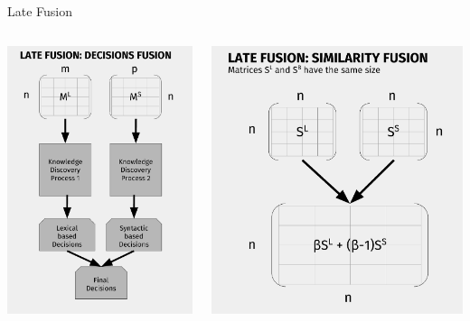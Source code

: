 \documentclass[10pt,xcolor=table]{beamer}
\begin{document}
\begin{frame}{Late Fusion}
\begin{columns}
	\center
	\begin{minipage}[c][0.5\textheight][c]{\linewidth}
	\centering
	\includegraphics[width=.9\linewidth]{image2/Chapitre3/lf1_diag.pdf}
	\end{minipage}
	\center
	\begin{minipage}[c][0.5\textheight][c]{\linewidth}
		\centering
	  	\includegraphics[width=.9\linewidth]{image2/Chapitre3/lf2_diag.pdf}

\end{minipage}
\end{columns}
\end{frame}
\end{document}
